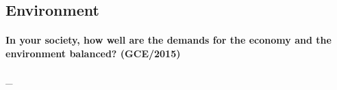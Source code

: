 \documentclass[../../main]{subfiles}
\begin{document}
\subsection{Environment}

\paragraph{In your society, how well are the demands for the economy and the environment balanced? (GCE/2015)} \_
\end{document}
